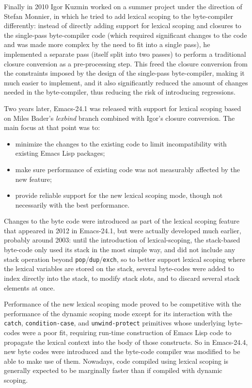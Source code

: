\documentclass[format=acmsmall, review]{acmart}
\newcommand \Elisp {Emacs Lisp}
\begin{document}
Finally in 2010 Igor Kuzmin worked on a summer project under the direction
of Stefan Monnier, in which he tried to add lexical scoping to the
byte-compiler differently:
instead of directly adding support for lexical scoping and closures to the
single-pass byte-compiler code (which required significant changes to the
code and was made more complex by the need to fit into a single pass), he
implemented a separate pass (itself split into two passes) to perform
a traditional closure conversion as a pre-processing step.  This freed the
closure conversion from the constraints imposed by the design of the
single-pass byte-compiler, making it much easier to implement, and it also
significantly reduced the amount of changes needed in the byte-compiler,
thus reducing the risk of introducing regressions.

Two years later, Emacs-24.1 was released with support for lexical
scoping based on Miles Bader's \emph{lexbind} branch combined with Igor's
closure conversion.  The main focus at that point was to:
\begin{itemize}
\item minimize the changes to the existing code to limit incompatibility
  with existing \Elisp{} packages;
\item make sure performance of existing code was not measurably affected by
  the new feature;
\item provide reliable support for the new lexical scoping mode, though not
  necessarily with the best performance.
\end{itemize}
Changes to the byte code were introduced as part of the lexical scoping
feature that appeared in 2012 in Emacs-24.1, but were actually developed
much earlier, probably around 2003: until the introduction of
lexical-scoping, the stack-based byte-code only used its stack in the most
simple way, and did not include any stack operation beyond
\texttt{pop}/\texttt{dup}/\texttt{exch}, so to better support lexical
scoping where the lexical variables are stored on the stack, several
byte-codes were added to index directly into the stack, to modify stack
slots, and to discard several stack elements at once.

Performance of the new lexical scoping mode proved to be competitive with
the performance of the dynamic scoping mode except for its interaction with
the \texttt{catch}, \texttt{condition-case}, and \texttt{unwind-protect}
primitives whose underlying byte-codes were a poor fit, requiring run-time
construction of \Elisp{} code to propagate the lexical context into the body
of those constructs.
So in Emacs-24.4, new byte codes were introduced and
the byte-code compiler was modified to be able to make use of them.  Nowadays,
code compiled using lexical scoping is generally expected to be marginally
faster than if compiled with dynamic scoping.
\end{document}
